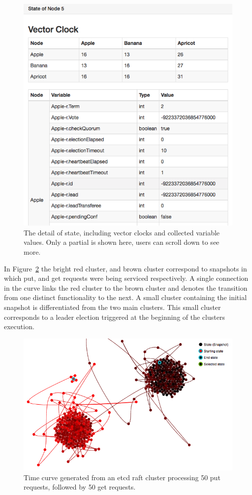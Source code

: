 \begin{figure}[h]
    \includegraphics[width=\linewidth]{fig/state-detail}%
    \caption{The detail of state, including vector clocks and 
    collected variable values. Only a partial is shown here, 
    users can scroll down to see more. \label{fig:state-detail}}%
\end{figure}

In Figure~\ref{fig:put-get-curve} the bright red cluster, and brown
cluster correspond to snapshots in which put, and get requests were
being serviced respectively. A single connection in the curve links the
red cluster to the brown cluster and denotes the transition from one
distinct functionality to the next. A small cluster containing the
initial snapshot is differentiated from the two main clusters. This
small cluster corresponds to a leader election triggered at the
beginning of the clusters execution.

\begin{figure}[h]
    \includegraphics[width=\linewidth]{fig/put-get-curve}%
    \caption{Time curve generated from an etcd raft cluster processing 50 put requests, followed by 50 get requests.\label{fig:put-get-curve}}%
\end{figure}
    
